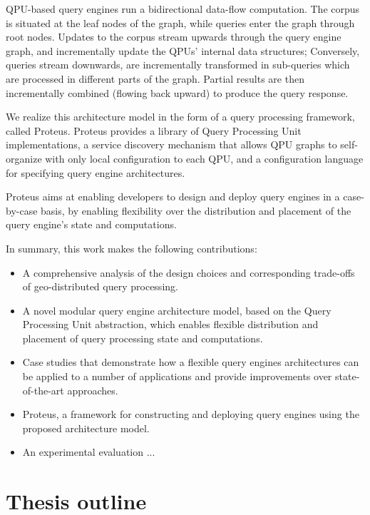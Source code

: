 QPU-based query engines run a bidirectional data-flow computation.
The corpus is situated at the leaf nodes of the graph, while queries enter the graph through root nodes.
Updates to the corpus stream upwards through the query engine graph, and incrementally update the QPUs’ internal data structures;
Conversely, queries stream downwards, are incrementally transformed in sub-queries which are processed in different parts of the graph.
Partial results are then incrementally combined (flowing back upward) to produce the query response.

\medskip
\noindent
We realize this architecture model in the form of a query processing framework, called Proteus.
Proteus provides a library of Query Processing Unit implementations,
a service discovery mechanism that allows QPU graphs to self-organize with only local configuration to each QPU,
and a configuration language for specifying query engine architectures.

Proteus aims at enabling developers to design and deploy query engines in a case-by-case basis,
by enabling flexibility over the distribution and placement of the query engine's state and computations.

In summary, this work makes the following contributions:

\begin{itemize}
  \item A comprehensive analysis of the design choices and corresponding trade-offs of geo-distributed query processing.

  \item A novel modular query engine architecture model, based on the Query Processing Unit abstraction,
  which enables flexible distribution and placement of query processing state and computations.

  \item Case studies that demonstrate how a flexible query engines architectures can be applied to a number of applications
  and provide improvements over state-of-the-art approaches.

  \item Proteus, a framework for constructing and deploying query engines using the proposed architecture model.

  \item An experimental evaluation ... 
\end{itemize}

\section{Thesis outline}

